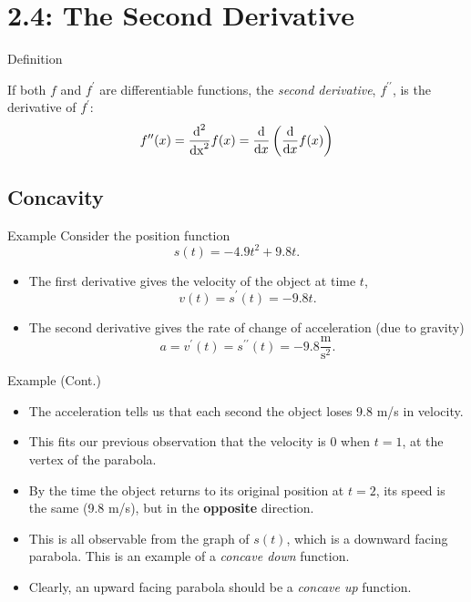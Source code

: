 \documentclass[Lecture.tex]{subfiles}
\begin{document}
\section{2.4: The Second Derivative}
\begin{frame}{Definition}
  \begin{defn}
    If both $f$ and $f^\prime$ are differentiable functions, the {\it second derivative}, $f^{\prime\prime}$, is the derivative of $f^\prime$:
    $$f^{\prime\prime}(x) = \frac{\operatorname{d}^2}{\operatorname{dx}^2}f(x) = \frac{\operatorname{d}}{\operatorname{d}\!x}\left(\frac{\operatorname{d}}{\operatorname{d}\!x} f(x)\right)$$
  \end{defn}
\end{frame}

\subsection{Concavity}

\begin{frame}{Example}
  Consider the position function 
  $$s(t) = -4.9t^2 + 9.8t.$$
  \begin{itemize}
  \item<2->
    The first derivative gives the velocity of the object at time $t$,
    $$v(t) = s^\prime(t) = -9.8t.$$
  \item<3->
    The second derivative gives the rate of change of acceleration (due to gravity)
    $$a = v^\prime(t) = s^{\prime\prime}(t) = -9.8 \frac{\text{m}}{\text{s}^2}.$$
  \end{itemize}
\end{frame}

\begin{frame}{Example (Cont.)}
  \begin{itemize}
  \item<1->
    The acceleration tells us that each second the object loses 9.8 m/s in velocity.
  \item<2->
    This fits our previous observation that the velocity is 0 when $t = 1$, at the vertex of the parabola.
  \item<3->
    By the time the object returns to its original position at $t = 2$, its speed is the same (9.8 m/s), but in the {\bf opposite} direction.
  \item<4->
    This is all observable from the graph of $s(t)$, which is a downward facing parabola.
    This is an example of a {\it concave down} function.
  \item<5->
    Clearly, an upward facing parabola should be a {\it concave up} function.
  \end{itemize}
\end{frame}
\end{document}
